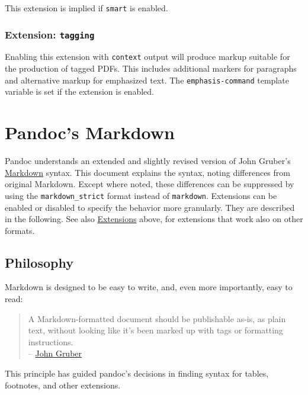 \documentclass[
]{article}
\begin{document}
This extension is implied if \texttt{smart} is enabled.

\hypertarget{extension--tagging}{%
\subsubsection{\texorpdfstring{Extension:
\texttt{tagging}}{Extension: tagging}}\label{extension--tagging}}

Enabling this extension with \texttt{context} output will produce markup
suitable for the production of tagged PDFs. This includes additional
markers for paragraphs and alternative markup for emphasized text. The
\texttt{emphasis-command} template variable is set if the extension is
enabled.

\hypertarget{pandocs-markdown}{%
\section{Pandoc's Markdown}\label{pandocs-markdown}}

Pandoc understands an extended and slightly revised version of John
Gruber's \href{https://daringfireball.net/projects/markdown/}{Markdown}
syntax. This document explains the syntax, noting differences from
original Markdown. Except where noted, these differences can be
suppressed by using the \texttt{markdown\_strict} format instead of
\texttt{markdown}. Extensions can be enabled or disabled to specify the
behavior more granularly. They are described in the following. See also
\protect\hyperlink{extensions}{Extensions} above, for extensions that
work also on other formats.

\hypertarget{philosophy}{%
\subsection{Philosophy}\label{philosophy}}

Markdown is designed to be easy to write, and, even more importantly,
easy to read:

\begin{quote}
A Markdown-formatted document should be publishable as-is, as plain
text, without looking like it's been marked up with tags or formatting
instructions.\\
--
\href{https://daringfireball.net/projects/markdown/syntax\#philosophy}{John
Gruber}
\end{quote}

This principle has guided pandoc's decisions in finding syntax for
tables, footnotes, and other extensions.
\end{document}
